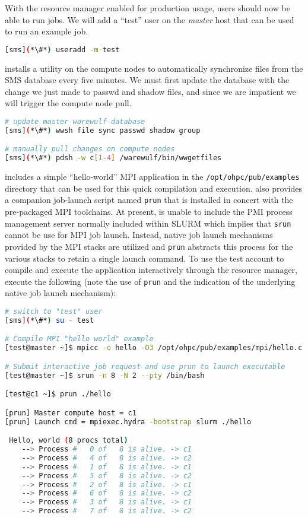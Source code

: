 With the resource manager enabled for production usage, users should now be
able to run jobs.  We will add a ``test'' user on the {\em master}
host that can be used to run an example job.

\begin{lstlisting}[language=bash,keywords={}]
[sms](*\#*) useradd -m test
\end{lstlisting}

\Warewulf{} installs a utility on the compute nodes to automatically 
synchronize files from the SMS database every five minutes. 
We must first update the database with the change we just made to passwd and 
shadow files, and since we are impatient we will trigger the compute node pull.

\begin{lstlisting}[language=bash,keywords={}]
# update master warewulf database
[sms](*\#*) wwsh file sync passwd shadow group

# manually pull changes on compute nodes
[sms](*\#*) pdsh -w c[1-4] /warewulf/bin/wwgetfiles 
\end{lstlisting}

\OHPC{} includes a simple ``hello-world'' MPI application in the
\texttt{/opt/ohpc/pub/examples} directory that can be used for this quick
compilation and execution. \OHPC{} also provides a companion job-launch
script named \texttt{prun} that is installed in concert with the pre-packaged
MPI toolchains. At present, \OHPC{} is unable to include the PMI process management
server normally included within SLURM which implies that \texttt{srun} cannot be
use for MPI job launch. Instead, native job launch mechanisms provided by the
MPI stacks are utilized and \texttt{prun} abstracts this process for the various
stacks to retain a single launch command. To use the test account to compile and execute the
application interactively through the resource manager, execute the following
(note the use of \texttt{prun} and the indication of the underlying native job
launch mechanism):

\begin{lstlisting}[language=bash,keywords={}]
# switch to "test" user
[sms](*\#*) su - test

# Compile MPI "hello world" example
[test@master ~]$ mpicc -o hello -O3 /opt/ohpc/pub/examples/mpi/hello.c

# Submit interactive job request and use prun to launch executable
[test@master ~]$ srun -n 8 -N 2 --pty /bin/bash

[test@c1 ~]$ prun ./hello

[prun] Master compute host = c1
[prun] Launch cmd = mpiexec.hydra -bootstrap slurm ./hello

 Hello, world (8 procs total)
    --> Process #   0 of   8 is alive. -> c1
    --> Process #   4 of   8 is alive. -> c2
    --> Process #   1 of   8 is alive. -> c1
    --> Process #   5 of   8 is alive. -> c2
    --> Process #   2 of   8 is alive. -> c1
    --> Process #   6 of   8 is alive. -> c2
    --> Process #   3 of   8 is alive. -> c1
    --> Process #   7 of   8 is alive. -> c2
\end{lstlisting}

